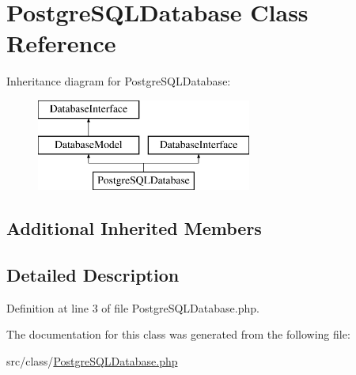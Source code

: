 \hypertarget{class_postgre_s_q_l_database}{}\section{Postgre\+S\+Q\+L\+Database Class Reference}
\label{class_postgre_s_q_l_database}
Inheritance diagram for Postgre\+S\+Q\+L\+Database\+:\begin{figure}[H]
\begin{center}
\leavevmode
\includegraphics[height=3.000000cm]{class_postgre_s_q_l_database}
\end{center}
\end{figure}
\subsection*{Additional Inherited Members}


\subsection{Detailed Description}


Definition at line 3 of file Postgre\+S\+Q\+L\+Database.\+php.



The documentation for this class was generated from the following file\+:\begin{DoxyCompactItemize}
\item 
src/class/\hyperlink{_postgre_s_q_l_database_8php}{Postgre\+S\+Q\+L\+Database.\+php}\end{DoxyCompactItemize}
